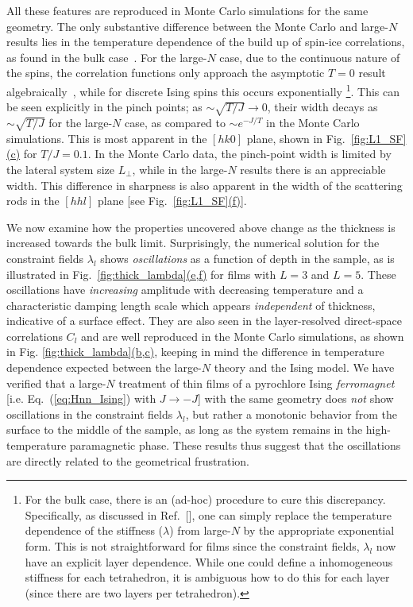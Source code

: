 \documentclass[aps,prx,reprint,runinaddress,superscriptaddress,amsmath,amssymb,floatfix,longbibliography]{revtex4-1}
\newcommand{\subref}[2]{\ref{#1}\hyperref[#1]{#2}}
\begin{document}
All these features are reproduced in Monte Carlo simulations for the same geometry. The only substantive difference between the Monte Carlo and large-$N$ results lies in the temperature dependence of the build up of spin-ice correlations, as found in the bulk case~\cite{Isakov2004}. For the large-$N$ case, due to the continuous nature of the spins, the correlation functions only approach the asymptotic $T=0$ result algebraically~\cite{Henley2005}, while for discrete Ising spins this occurs exponentially \footnote{For the bulk case, there is an (ad-hoc) procedure to cure this discrepancy. Specifically, as discussed in Ref.~[], one can simply replace the temperature dependence of the stiffness ($\lambda$) from large-$N$ by the appropriate exponential form. This is not straightforward for films since the constraint fields, $\lambda_{l}$ now have an explicit layer dependence. While one could define a inhomogeneous stiffness for each tetrahedron, it is ambiguous how to do this for each layer (since there are two layers per tetrahedron). }. This can be seen explicitly in the pinch points; as $\sim \sqrt{T/J} \rightarrow 0$, their width decays as $\sim \sqrt{T/J}$ for the large-$N$ case, as compared to $\sim e^{-J/T}$ in the Monte Carlo simulations. This is most apparent in the $[hk0]$ plane, shown in Fig.~\subref{fig:L1_SF}{(c)} for $T/J=0.1$. In the Monte Carlo data, the pinch-point width is limited by the lateral system size $L_\perp$, while in the large-$N$ results there is an appreciable width. This difference in sharpness is also apparent in the width of the scattering rods in the $[hhl]$ plane [see Fig.~\subref{fig:L1_SF}{(f)}]. 

We now examine how the properties uncovered above change as the thickness is increased towards the bulk limit. Surprisingly, the numerical solution for the constraint fields $\lambda_l$ shows \emph{oscillations} as a function of depth in the sample, as is illustrated in Fig.~\subref{fig:thick_lambda}{(e,f)} for films with $L=3$ and $L=5$. These oscillations have \emph{increasing} amplitude with decreasing temperature and a characteristic damping length scale which appears \emph{independent} of thickness, indicative of a surface effect. They are also seen in the layer-resolved direct-space correlations $C_l$ and are well reproduced in the Monte Carlo simulations, as shown in Fig. \subref{fig:thick_lambda}{(b,c)}, keeping in mind the difference in temperature dependence expected between the large-$N$ theory and the Ising model. We have verified that a large-$N$ treatment of thin films of a pyrochlore Ising \emph{ferromagnet} [i.e. Eq.~(\ref{eq:Hnn_Ising}) with $J \rightarrow -J$] with the same geometry does \emph{not} show oscillations in the constraint fields $\lambda_l$, but rather a monotonic behavior from the surface to the middle of the sample, as long as the system remains in the high-temperature paramagnetic phase. These results thus suggest that the oscillations are directly related to the geometrical frustration.
\end{document}
